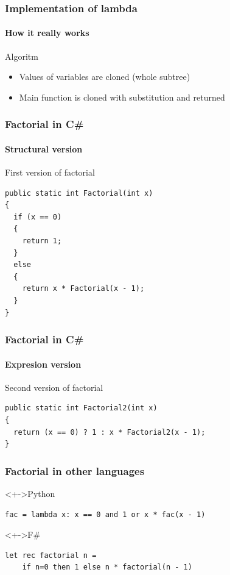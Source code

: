 \documentclass{beamer}
\begin{document}
\begin{frame}
	\frametitle{Implementation of lambda}
	\framesubtitle{How it really works}
	\begin{block}{Algoritm}
		\begin{itemize}[<+->]
			\item Values of variables are cloned (whole subtree)
			\item Main function is cloned with substitution and returned
		\end{itemize}
	\end{block}
\end{frame}

\begin{frame}[fragile]
	\frametitle{Factorial in C\#}
	\framesubtitle{Structural version}

	\begin{block}{First version of factorial}
\begin{verbatim}
public static int Factorial(int x)
{
  if (x == 0)
  {
    return 1;
  }
  else
  {
    return x * Factorial(x - 1);
  }
}
\end{verbatim}
	\end{block}
\end{frame}

\begin{frame}[fragile]
	\frametitle{Factorial in C\#}
	\framesubtitle{Expresion version}

	\begin{block}{Second version of factorial}
\begin{verbatim}
public static int Factorial2(int x)
{
  return (x == 0) ? 1 : x * Factorial2(x - 1);
}
\end{verbatim}
	\end{block}
\end{frame}

\begin{frame}[fragile]
        \frametitle{Factorial in other languages}

	\begin{block}<+->{Python}
\begin{verbatim}
fac = lambda x: x == 0 and 1 or x * fac(x - 1)
\end{verbatim}
	\end{block}

	\begin{block}<+->{F\#}
\begin{verbatim}
let rec factorial n =
    if n=0 then 1 else n * factorial(n - 1)
\end{verbatim}
	\end{block}
\end{frame}
\end{document}

